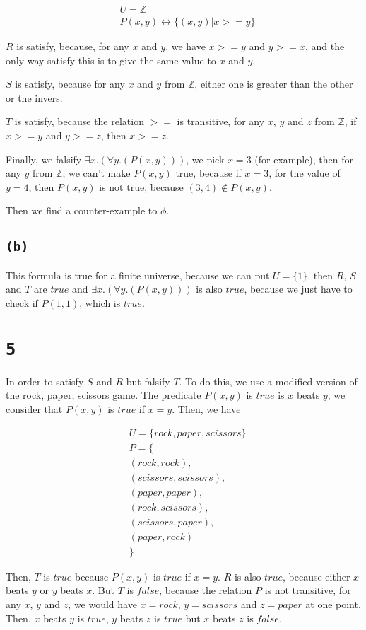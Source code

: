 \documentclass[a4paper,11pt]{report}
\begin{document}
\begin{align*}
  & U = \mathbb{Z} \\
  & P(x,y) \leftrightarrow \{(x,y) | x >= y\}
\end{align*}

$R$ is satisfy, because, for any $x$ and $y$, we have $x >= y$ and $y >= x$, and
the only way satisfy this is to give the same value to $x$ and $y$.

$S$ is satisfy, because for any $x$ and $y$ from $\mathbb{Z}$, either one is
greater than the other or the invers.

$T$ is satisfy, because the relation $>=$ is transitive, for any $x$, $y$ and
$z$ from $\mathbb{Z}$, if $x >= y$ and $y >= z$, then $x >= z$.

Finally, we falsify $\exists x.(\forall y.(P(x,y)))$, we pick $x=3$ (for example), then for
any $y$ from $\mathbb{Z}$, we can't make $P(x,y)$ true, because if $x=3$, for
the value of $y=4$, then $P(x,y)$ is not true, because $(3,4) \not\in P(x,y)$.

Then we find a counter-example to $\phi$.

\subsection*{\texttt{(b)}}

This formula is true for a finite universe, because we can put $U = \{1\}$, then
$R$, $S$ and $T$ are $true$ and $\exists x.(\forall y.(P(x,y)))$ is also $true$,
because we just have to check if $P(1,1)$, which is $true$.

\section*{\texttt{5}}

In order to satisfy $S$ and $R$ but falsify $T$. To do this, we use a modified
version of the rock, paper, scissors game. The predicate $P(x,y)$ is $true$ is
$x$ beats $y$, we consider that $P(x,y)$ is $true$ if $x = y$. Then, we have

\begin{align*}
  & U = \{rock,paper,scissors\} \\
  & P = \{ \\
  & (rock,rock), \\
  & (scissors,scissors), \\
  & (paper,paper), \\
  & (rock,scissors), \\
  & (scissors,paper), \\
  & (paper,rock) \\
  & \}
\end{align*}

Then, $T$ is $true$ because $P(x,y)$ is $true$ if $x=y$. $R$ is also $true$,
because either $x$ beats $y$ or $y$ beats $x$. But $T$ is $false$, because the
relation $P$ is not transitive, for any $x$, $y$ and $z$, we would have $x =
rock$, $y = scissors$ and $z = paper$ at one point. Then, $x$ beats $y$ is
$true$, $y$ beats $z$ is $true$ but $x$ beats $z$ is $false$.
\end{document}
